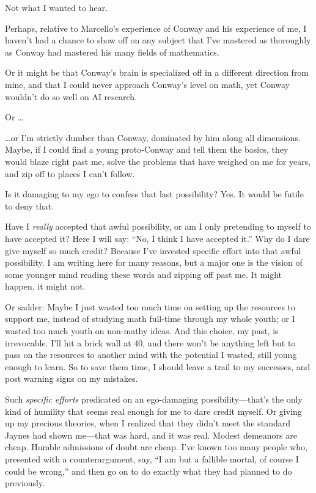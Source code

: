 {
 Not what I wanted to hear.}

{
 Perhaps, relative to Marcello's experience of
Conway and his experience of me, I haven't had a chance
to show off on any subject that I've mastered as
thoroughly as Conway had mastered his many fields of mathematics.}

{
 Or it might be that Conway's brain is specialized
off in a different direction from mine, and that I could never approach
Conway's level on math, yet Conway
wouldn't do so well on AI research.}

{
 Or \ldots}

{
 \ldots or I'm strictly dumber than Conway,
dominated by him along all dimensions. Maybe, if I could find a young
proto-Conway and tell them the basics, they would blaze right past me,
solve the problems that have weighed on me for years, and zip off to
places I can't follow.}

{
 Is it damaging to my ego to confess that last possibility? Yes. It
would be futile to deny that.}

{
 Have I \textit{really} accepted that awful possibility, or am I
only pretending to myself to have accepted it? Here I will say:
``No, I think I have accepted it.''
Why do I dare give myself so much credit? Because I've
invested specific effort into that awful possibility. I am writing here
for many reasons, but a major one is the vision of some younger mind
reading these words and zipping off past me. It might happen, it might
not.}

{
 Or sadder: Maybe I just wasted too much time on setting up the
resources to support me, instead of studying math full-time through my
whole youth; or I wasted too much youth on non-mathy ideas. And this
choice, my past, is irrevocable. I'll hit a brick wall
at 40, and there won't be anything left but to pass on
the resources to another mind with the potential I wasted, still young
enough to learn. So to save them time, I should leave a trail to my
successes, and post warning signs on my mistakes.}

{
 Such \textit{specific efforts} predicated on an ego-damaging
possibility---that's the only kind of humility that
seems real enough for me to dare credit myself. Or giving up my
precious theories, when I realized that they didn't
meet the standard Jaynes had shown me---that was hard, and it was real.
Modest demeanors are cheap. Humble admissions of doubt are cheap.
I've known too many people who, presented with a
counterargument, say, ``I am but a fallible mortal, of
course I could be wrong,'' and then go on to do
exactly what they had planned to do previously.}

